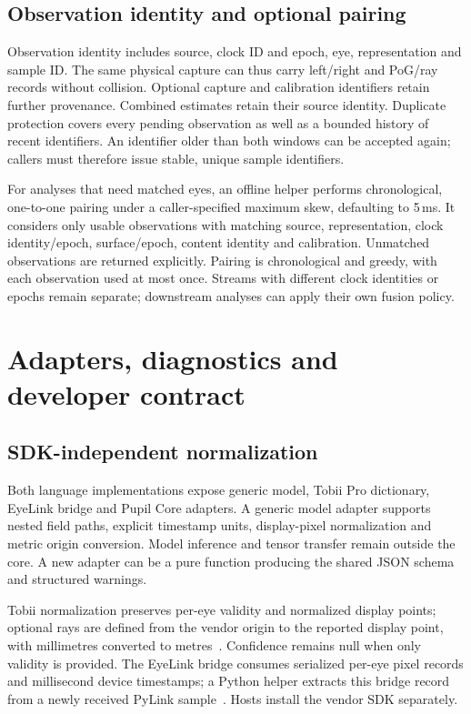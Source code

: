 \documentclass[sigconf,screen,nonacm]{acmart}
\begin{document}
\subsection{Observation identity and optional pairing}
Observation identity includes source, clock ID and epoch, eye, representation
and sample ID. The same physical capture can thus carry left/right and PoG/ray
records without collision. Optional capture and calibration identifiers retain
further provenance. Combined estimates retain their source identity.
Duplicate protection covers every pending observation as well as a bounded
history of recent identifiers. An identifier older than both windows can be
accepted again; callers must therefore issue stable, unique sample identifiers.

For analyses that need matched eyes, an offline helper performs chronological,
one-to-one pairing under a caller-specified maximum skew, defaulting to 5\,ms.
It considers only usable observations with matching source, representation,
clock identity/epoch, surface/epoch, content identity and calibration. Unmatched observations are
returned explicitly. Pairing is chronological and greedy, with each observation
used at most once. Streams with different clock identities or epochs remain
separate; downstream analyses can apply their own fusion policy.

\section{Adapters, diagnostics and developer contract}
\subsection{SDK-independent normalization}
Both language implementations expose generic model, Tobii Pro dictionary,
EyeLink bridge and Pupil Core adapters. A generic model adapter supports nested
field paths, explicit timestamp units, display-pixel normalization and metric
origin conversion. Model inference and tensor transfer remain outside the core.
A new adapter can be a pure function producing the shared JSON schema and
structured warnings.

Tobii normalization preserves per-eye validity and normalized display points;
optional rays are defined from the vendor origin to the reported display point,
with millimetres converted to metres~\cite{tobii}. Confidence remains null when
only validity is provided. The EyeLink bridge consumes serialized per-eye pixel
records and millisecond device timestamps; a Python helper extracts this bridge
record from a newly received PyLink sample~\cite{eyelink}. Hosts install the
vendor SDK separately.
\end{document}
